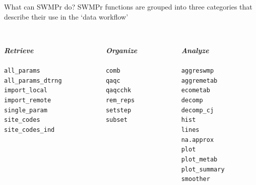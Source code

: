 \documentclass[serif]{beamer}\usepackage[]{graphicx}\usepackage[]{color}
\newcommand{\Bigtxt}[1]{\textbf{\textit{#1}}}
\begin{document}
\begin{frame}[t]{What can SWMPr do?}
SWMPr functions are grouped into three categories that describe their use in the `data workflow' \\~\\
\begin{columns}[t]
\begin{column}{0.3\textwidth}
\Bigtxt{Retrieve}\\~\\
\small{
\texttt{all\_params}\\
\texttt{all\_params_dtrng}\\
\texttt{import\_local}\\
\texttt{import\_remote}\\
\texttt{single\_param}\\
\texttt{site\_codes}\\
\texttt{site\_codes\_ind}
}
\end{column}
\begin{column}{0.3\textwidth}
\Bigtxt{Organize}\\~\\
\small{
\texttt{comb}\\
\texttt{qaqc}\\
\texttt{qaqcchk}\\
\texttt{rem\_reps}\\
\texttt{setstep}\\
\texttt{subset}\\
}
\end{column}
\begin{column}{0.3\textwidth}
\Bigtxt{Analyze}\\~\\
\small{
\texttt{aggreswmp}\\
\texttt{aggremetab}\\
\texttt{ecometab}\\
\texttt{decomp}\\
\texttt{decomp\_cj}\\
\texttt{hist}\\
\texttt{lines}\\
\texttt{na.approx}\\
\texttt{plot}\\
\texttt{plot\_metab}\\
\texttt{plot\_summary}\\
\texttt{smoother}\\
}
\end{column}
\end{columns}
\end{frame}
\end{document}

